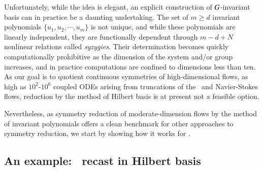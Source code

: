 \documentclass[final,number,sort&compress]{elsarticle}
\begin{document}
Unfortunately, while the idea is elegant, an explicit
construction of $G${-in\-vari\-ant} basis can in
practice be a daunting undertaking. The set  of $m \geq d$
in\-vari\-ant polynomials $\{u_1,u_2,\cdots,u_m\}$ is not
unique, and while these polynomials are linearly independent,
they are functionally dependent through $m-d+N$ nonlinear
relations called \emph{syzygies}. Their determination becomes
quickly computationally prohibitive as the dimension of the
system and/or group increases,
and in practice computations are confined to
dimensions less than ten. As our goal is to quotient
continuous symmetries of high-dimensional flows, as high as
$10^2$-$10^6$ coupled ODEs arising from
truncations of the \KS\ and Navier-Stokes flows, reduction by
the method of Hilbert basis is at present not a feasible
option.

Nevertheless, as symmetry reduction of moderate-dimension
flows by the method of in\-vari\-ant polynomials offers a clean
benchmark for other approaches to symmetry reduction, we start
by showing how it works for \cLf.


\subsection{\label{s:cLeHilbert} An example: \CLe\ recast in Hilbert basis}
\end{document}
